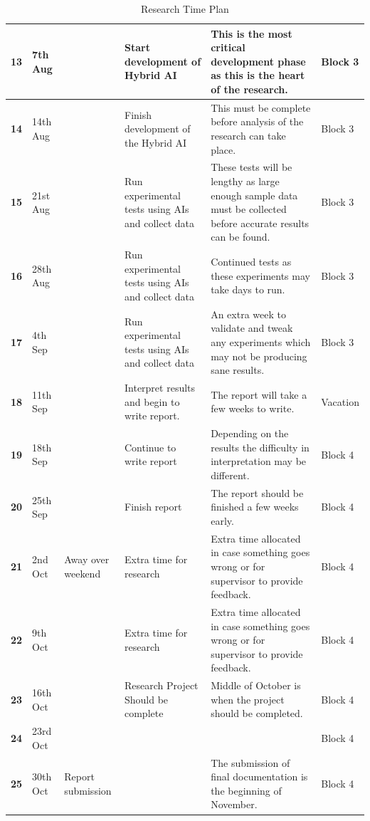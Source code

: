 \documentclass [11pt]{article}
\begin{document}
\begin{table}[H]
{\begin{tabular}{|l|l|l|p{6cm}|p{6cm}|p{6cm}|}
				\textbf{13} & 7th Aug &  & Start development of Hybrid AI & This is the most critical development phase as this is the heart of the research. & Block 3 \\ \hline
				\textbf{14} & 14th Aug &  & Finish development of the Hybrid AI & This must be complete before analysis of the research can take place. & Block 3 \\ \hline
				\textbf{15} & 21st Aug &  & Run experimental tests using AIs and collect data & These tests will be lengthy as large enough sample data must be collected before accurate results can be found. & Block 3 \\ \hline
				\textbf{16} & 28th Aug &  & Run experimental tests using AIs and collect data & Continued tests as these experiments may take days to run. & Block 3 \\ \hline
				\textbf{17} & 4th Sep &  & Run experimental tests using AIs and collect data & An extra week to validate and tweak any experiments which may not be producing sane results. & Block 3 \\ \hline
				\textbf{18} & 11th Sep &  & Interpret results and begin to write report. & The report will take a few weeks to write. & Vacation \\ \hline
				\textbf{19} & 18th Sep &  & Continue to write report & Depending on the results the difficulty in interpretation may be different. & Block 4 \\ \hline
				\textbf{20} & 25th Sep &  & Finish report & The report should be finished a few weeks early. & Block 4 \\ \hline
				\textbf{21} & 2nd Oct & Away over weekend & Extra time for research & Extra time allocated in case something goes wrong or for supervisor to provide feedback. & Block 4 \\ \hline
				\textbf{22} & 9th Oct &  & Extra time for research & Extra time allocated in case something goes wrong or for supervisor to provide feedback. & Block 4 \\ \hline
				\textbf{23} & 16th Oct &  & Research Project Should be complete & Middle of October is when the project should be completed. & Block 4 \\ \hline
				\textbf{24} & 23rd Oct &  &  &  & Block 4 \\ \hline
				\textbf{25} & 30th Oct & Report submission &  & The submission of final documentation is the beginning of November. & Block 4 \\ \hline
			\end{tabular}
		}
		\caption{Research Time Plan}
		\label{time-plan}
	\end{table}
	
\end{document}
